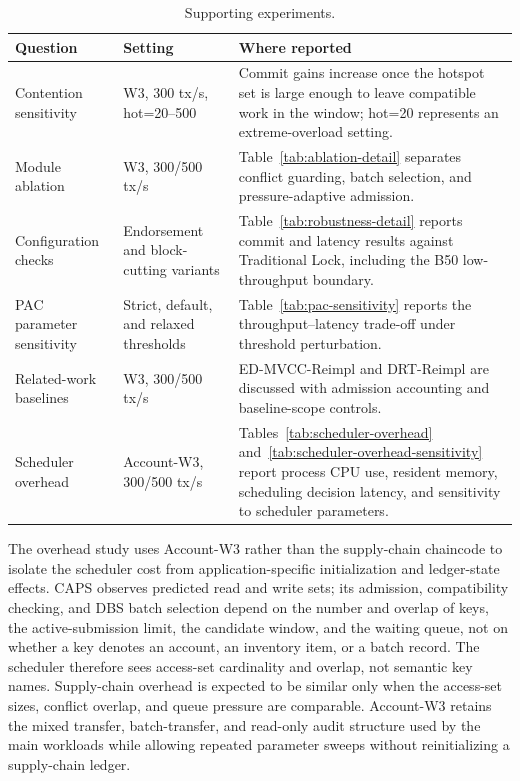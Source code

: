 \documentclass[fleqn,10pt,lineno]{wlpeerj}
\begin{document}
\begin{table}[ht]
\centering
\small
\caption{Supporting experiments.}
\label{tab:supporting-evidence}
\begin{tabularx}{\textwidth}{@{}p{}p{}X@{}}
\toprule
Question & Setting & Where reported \\
\midrule
Contention sensitivity & W3, 300 tx/s, hot=20--500 & Commit gains increase once the hotspot set is large enough to leave compatible work in the window; hot=20 represents an extreme-overload setting. \\
Module ablation & W3, 300/500 tx/s & Table~\ref{tab:ablation-detail} separates conflict guarding, batch selection, and pressure-adaptive admission. \\
Configuration checks & Endorsement and block-cutting variants & Table~\ref{tab:robustness-detail} reports commit and latency results against Traditional Lock, including the B50 low-throughput boundary. \\
PAC parameter sensitivity & Strict, default, and relaxed thresholds & Table~\ref{tab:pac-sensitivity} reports the throughput--latency trade-off under threshold perturbation. \\
Related-work baselines & W3, 300/500 tx/s & ED-MVCC-Reimpl and DRT-Reimpl are discussed with admission accounting and baseline-scope controls. \\
Scheduler overhead & Account-W3, 300/500 tx/s & Tables~\ref{tab:scheduler-overhead} and~\ref{tab:scheduler-overhead-sensitivity} report process CPU use, resident memory, scheduling decision latency, and sensitivity to scheduler parameters. \\
\bottomrule
\end{tabularx}
\end{table}

The overhead study uses Account-W3 rather than the supply-chain chaincode to isolate the scheduler cost from application-specific initialization and ledger-state effects. CAPS observes predicted read and write sets; its admission, compatibility checking, and DBS batch selection depend on the number and overlap of keys, the active-submission limit, the candidate window, and the waiting queue, not on whether a key denotes an account, an inventory item, or a batch record. The scheduler therefore sees access-set cardinality and overlap, not semantic key names. Supply-chain overhead is expected to be similar only when the access-set sizes, conflict overlap, and queue pressure are comparable. Account-W3 retains the mixed transfer, batch-transfer, and read-only audit structure used by the main workloads while allowing repeated parameter sweeps without reinitializing a supply-chain ledger.
\end{document}
